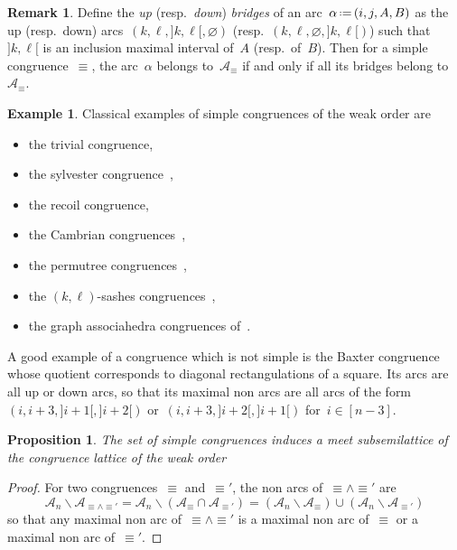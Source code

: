 \documentclass{amsart}
\newtheorem{proposition}[theorem]{Proposition}
\theoremstyle{definition}
\newtheorem{example}[theorem]{Example}
\newtheorem{remark}[theorem]{Remark}
\newcommand{\ssm}{\smallsetminus} %
\newcommand{\eqdef}{\mbox{\,\raisebox{0.2ex}{\scriptsize\ensuremath{\mathrm:}}\ensuremath{=}\,}} %
\newcommand{\darkblue}{\color{darkblue}} %
\newcommand{\defn}[1]{\textsl{\darkblue #1}} %
\newcommand{\arc}{\alpha} %
\newcommand{\arcs}{{\mathcal{A}}} %
\newcommand{\nonarcs}{{\mathcal{B}}} %
\newcommand{\meet}{\wedge} %
\begin{document}
\begin{remark}
\label{rem:bridges}
Define the \defn{up} (resp.~\defn{down}) \defn{bridges} of an arc~$\arc \eqdef (i, j, A, B)$ as the up (resp.~down) arcs~$(k, \ell, {]k, \ell[}, \varnothing)$ (resp.~$(k, \ell, \varnothing, {]k, \ell[})$) such that~$]k,\ell[$ is an inclusion maximal interval of~$A$ (resp.~of~$B$).
Then for a simple congruence~$\equiv$, the arc~$\arc$ belongs to~$\arcs_\equiv$ if and only if all its bridges belong to~$\arcs_\equiv$.
\end{remark}

\begin{example}
Classical examples of simple congruences of the weak order are
\begin{itemize}
\item the trivial congruence,
\item the sylvester congruence~\cite{Tonks, HivertNovelliThibon-algebraBinarySearchTrees},
\item the recoil congruence,
\item the Cambrian congruences~\cite{Reading-CambrianLattices, ChatelPilaud},
\item the permutree congruences~\cite{PilaudPons-permutrees},
\item the $(k,\ell)$-sashes congruences~\cite{LaniniNovelli},
\item the graph associahedra congruences of~\cite{BarnardMcConville}.
\end{itemize}
A good example of a congruence which is not simple is the Baxter congruence~\cite{LawReading, Giraudo} whose quotient corresponds to diagonal rectangulations of a square. Its arcs are all up or down arcs, so that its maximal non arcs are all arcs of the form~$(i, i+3, {]i+1[}, {]i+2[})$ or~$(i, i+3, {]i+2[}, {]i+1[})$ for~$i \in [n-3]$.
\end{example}

\begin{proposition}
\label{prop:simpleCongruenceMeetSemilattice}
The set of simple congruences induces a meet subsemilattice of the congruence lattice of the weak order
\end{proposition}

\begin{proof}
For two congruences~$\equiv$ and~$\equiv'$, the non arcs of~${\equiv} \meet {\equiv'}$ are
\[
\arcs_n \ssm \arcs_{{\equiv} \meet {\equiv'}} = \arcs_n \ssm (\arcs_{\equiv} \cap \arcs_{\equiv'}) = (\arcs_n \ssm \arcs_{\equiv}) \cup (\arcs_n \ssm \arcs_{\equiv'})
\]
so that any maximal non arc of~${\equiv} \meet {\equiv'}$ is a maximal non arc of~${\equiv}$ or a maximal non arc of~${\equiv'}$.
\end{proof}
\end{document}
